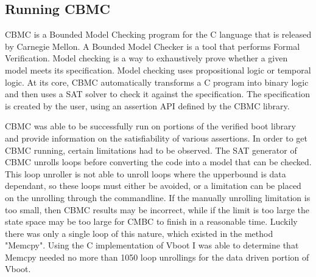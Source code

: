 \documentclass[../report.tex]{subfiles}
\begin{document}
\subsection{Running CBMC}

CBMC is a Bounded Model Checking program for the C language that is released by
Carnegie Mellon. 
A Bounded Model Checker is a tool that performs Formal Verification.
Model checking is a way to exhaustively prove whether a given model meets its
specification.
Model checking uses propositional logic or temporal logic. 
At its core, CBMC automatically transforms a C program into binary logic and
then uses a SAT solver to check it against the specification. 
The specification is created by the user, using an assertion API defined by the
CBMC library. 

CBMC was able to be successfully run on portions of the verified boot library and provide information on the satisfiability of various assertions.
In order to get CBMC running, certain limitations had to be observed.
The SAT generator of CBMC unrolls loops before converting the code into a model that can be checked.
This loop unroller is not able to unroll loops where the upperbound is data dependant, so these loops must either be avoided, or a limitation can be placed on the unrolling through the commandline. 
If the manually unrolling limitation is too small, then CBMC results may be incorrect, while if the limit is too large the state space may be too large for CMBC to finish in a reasonable time.
Luckily there was only a single loop of this nature, which existed in the method "Memcpy".
Using the C implementation of Vboot I was able to determine that Memcpy needed no more than 1050 loop unrollings for the data driven portion of Vboot.
\end{document}
